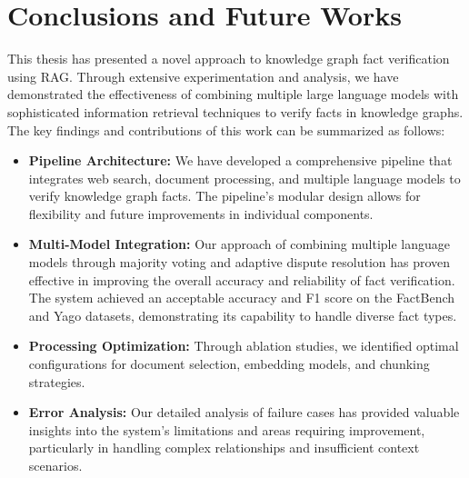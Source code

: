 \chapter{Conclusions and Future Works}\label{ch:conclusions}
This thesis has presented a novel approach to knowledge graph fact verification using RAG. Through extensive experimentation and analysis, we have demonstrated the effectiveness of combining multiple large language models with sophisticated information retrieval techniques to verify facts in knowledge graphs.
The key findings and contributions of this work can be summarized as follows:
\begin{itemize}
    \item \textbf{Pipeline Architecture:} We have developed a comprehensive pipeline that integrates web search, document processing, and multiple language models to verify knowledge graph facts. The pipeline's modular design allows for flexibility and future improvements in individual components.
    \item \textbf{Multi-Model Integration:} Our approach of combining multiple language models through majority voting and adaptive dispute resolution has proven effective in improving the overall accuracy and reliability of fact verification. The system achieved an acceptable accuracy and F1 score on the FactBench and Yago datasets, demonstrating its capability to handle diverse fact types.
    \item \textbf{Processing Optimization:} Through ablation studies, we identified optimal configurations for document selection, embedding models, and chunking strategies.
    \item \textbf{Error Analysis:} Our detailed analysis of failure cases has provided valuable insights into the system's limitations and areas requiring improvement, particularly in handling complex relationships and insufficient context scenarios.
\end{itemize}

